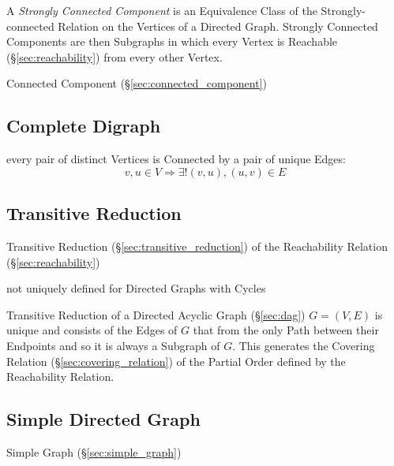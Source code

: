 A \emph{Strongly Connected Component} is an Equivalence Class of the
Strongly-connected Relation on the Vertices of a Directed Graph.
Strongly Connected Components are then Subgraphs in which every Vertex
is Reachable (\S\ref{sec:reachability}) from every other Vertex.

Connected Component (\S\ref{sec:connected_component})



\subsection{Complete Digraph}\label{sec:complete_digraph}

every pair of distinct Vertices is Connected by a pair of unique
Edges:
\[
  v,u \in V \Rightarrow \exists! (v,u), (u,v) \in E
\]



\subsection{Transitive Reduction}
\label{sec:transitive_reduction_graph}

Transitive Reduction (\S\ref{sec:transitive_reduction}) of the
Reachability Relation (\S\ref{sec:reachability})

not uniquely defined for Directed Graphs with Cycles

Transitive Reduction of a Directed Acyclic Graph (\S\ref{sec:dag}) $G
= (V,E)$ is unique and consists of the Edges of $G$ that from the only
Path between their Endpoints and so it is always a Subgraph of $G$.
This generates the Covering Relation (\S\ref{sec:covering_relation})
of the Partial Order defined by the Reachability Relation.



\subsection{Simple Directed Graph}\label{sec:simple_directed}

Simple Graph (\S\ref{sec:simple_graph})

